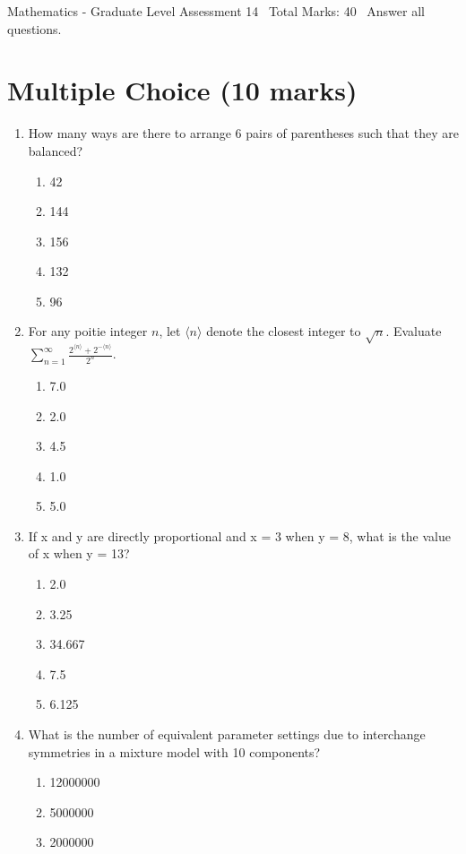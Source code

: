 \documentclass[12pt]{article}
\begin{document}
\begin{center}
Mathematics - Graduate Level Assessment 14 \
Total Marks: 40 \
Answer all questions.
\end{center}

\section*{Multiple Choice (10 marks)}
\begin{enumerate}[label=\arabic*.]
\item How many ways are there to arrange 6 pairs of parentheses such that they are balanced?
\begin{enumerate}[label=(\alph*)]
    \item 42
    \item 144
    \item 156
    \item 132
    \item 96
\end{enumerate}
\item For any poitie integer $n$, let $\langle n\rangle$ denote the closest integer to $\sqrt{n}$. Evaluate $\sum_{n=1}^{\infty} \frac{2^{\langle n \rangle}+2^{-\langle n \rangle}}{2^n}$.
\begin{enumerate}[label=(\alph*)]
    \item 7.0
    \item 2.0
    \item 4.5
    \item 1.0
    \item 5.0
\end{enumerate}
\item If x and y are directly proportional and x = 3 when y = 8, what is the value of x when y = 13?
\begin{enumerate}[label=(\alph*)]
    \item 2.0
    \item 3.25
    \item 34.667
    \item 7.5
    \item 6.125
\end{enumerate}
\item What is the number of equivalent parameter settings due to interchange symmetries in a mixture model with 10 components?
\begin{enumerate}[label=(\alph*)]
    \item 12000000
    \item 5000000
    \item 2000000

\end{enumerate}
\end{enumerate}
\end{document}
